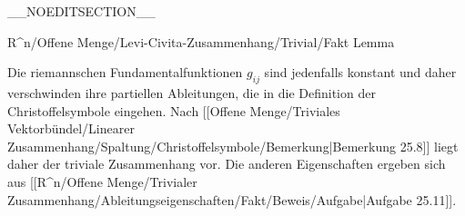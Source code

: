 __NOEDITSECTION__

{R^n/Offene Menge/Levi-Civita-Zusammenhang/Trivial/Fakt}
{Lemma}
{}
{

\faktzusatz {}
\faktzusatz {}

}
{

Die riemannschen Fundamentalfunktionen $g_{ij}$ sind jedenfalls konstant und daher verschwinden ihre partiellen Ableitungen, die in die Definition der Christoffelsymbole eingehen. Nach
[[Offene Menge/Triviales Vektorbündel/Linearer Zusammenhang/Spaltung/Christoffelsymbole/Bemerkung|Bemerkung 25.8]]
liegt daher der triviale Zusammenhang vor. Die anderen Eigenschaften ergeben sich aus
[[R^n/Offene Menge/Trivialer Zusammenhang/Ableitungseigenschaften/Fakt/Beweis/Aufgabe|Aufgabe 25.11]].

}

